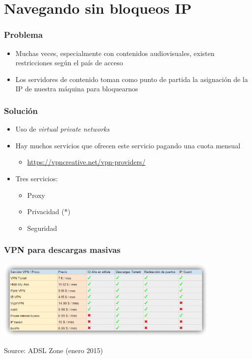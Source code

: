 

\section{Navegando sin bloqueos IP}



\begin{frame}
\frametitle{Problema}

\begin{itemize}
   \item Muchas veces, especialmente con contenidos audiovisuales, existen
   restricciones según el país de acceso
   \item Los servidores de contenido toman como punto de partida la asignación
   de la IP de nuestra máquina para bloquearnos
\end{itemize}

\end{frame}


\begin{frame}
\frametitle{Solución}

\begin{itemize}
   \item Uso de \emph{virtual private networks}
   \item Hay muchos servicios que ofrecen este servicio pagando una cuota mensual
   \begin{itemize}
     \item \url{https://vpncreative.net/vpn-providers/}
   \end{itemize}
   \item Tres servicios:
   \begin{itemize}
     \item Proxy
     \item Privacidad (*)
     \item Seguridad
   \end{itemize}
\end{itemize}

\end{frame}




\begin{frame}
\frametitle{VPN para descargas masivas}

\begin{center}
  \includegraphics[width=11cm]{figs/vpn-proxy.png}
\end{center}


\begin{flushright}
{\tiny
Source: ADSL Zone (enero 2015)
}
\end{flushright}

\end{frame}





